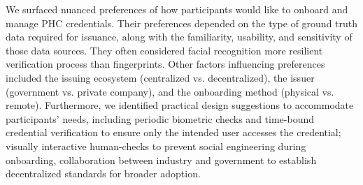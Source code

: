 We surfaced nuanced preferences of how participants would like to onboard and manage PHC credentials.
Their preferences depended on the type of ground truth data required for issuance, along with the familiarity, usability, and sensitivity of those data sources. They often considered facial recognition more resilient verification process than fingerprints.
 Other factors influencing preferences included the issuing ecosystem (centralized vs. decentralized), the issuer (government vs. private company), and the onboarding method (physical vs. remote).
Furthermore, we identified practical design suggestions to accommodate participants' needs, including periodic biometric checks and time-bound credential verification to ensure only the intended user accesses the credential; visually interactive human-checks to prevent social engineering during onboarding, collaboration between industry and government to establish decentralized standards for broader adoption.
